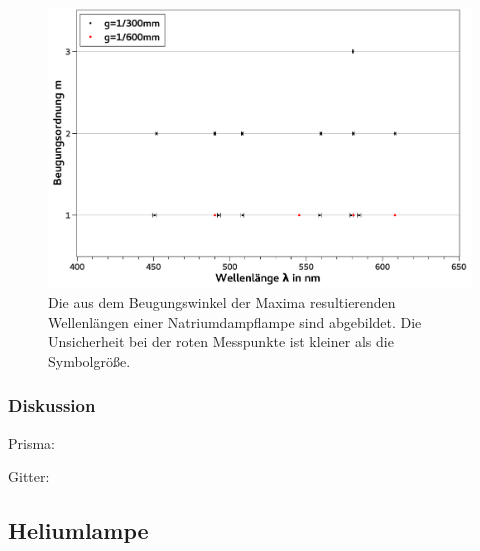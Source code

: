 \documentclass[
	a4paper,
	12pt,
	pagesize,
	ngerman
]{scrartcl}
\begin{document}
	\begin{figure}[H] %
		\includegraphics[width=1\textwidth]{fig_natrium}  %
		\centering
		\caption{Die aus dem Beugungswinkel der Maxima resultierenden Wellenlängen einer Natriumdampflampe sind abgebildet.
		Die Unsicherheit bei der roten Messpunkte ist kleiner als die Symbolgröße.}
		\label{fig_natrium}
		\centering
	\end{figure}

	\subsubsection{Diskussion}
	Prisma:
	
	Gitter:
	
	\subsection{Heliumlampe} \label{ss_helium}
\end{document}
